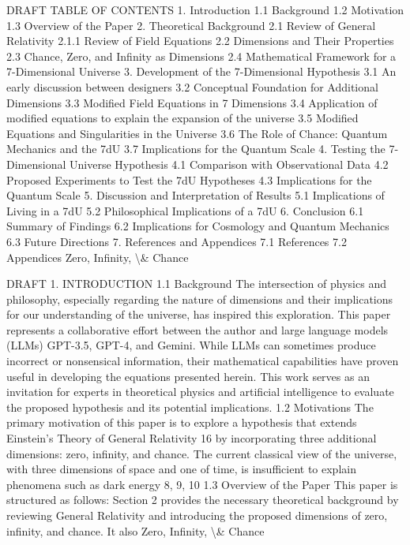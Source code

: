 \documentclass[12pt]{article}
\begin{document}
DRAFT
TABLE OF CONTENTS
1. Introduction
1.1 Background
1.2 Motivation
1.3 Overview of the Paper
2. Theoretical Background
2.1 Review of General Relativity
2.1.1 Review of Field Equations
2.2 Dimensions and Their Properties
2.3 Chance, Zero, and Inﬁnity as Dimensions
2.4 Mathematical Framework for a 7-Dimensional Universe
3. Development of the 7-Dimensional Hypothesis
3.1 An early discussion between designers
3.2 Conceptual Foundation for Additional Dimensions
3.3 Modiﬁed Field Equations in 7 Dimensions
3.4 Application of modiﬁed equations to explain the expansion of the universe
3.5 Modiﬁed Equations and Singularities in the Universe
3.6 The Role of Chance: Quantum Mechanics and the 7dU
3.7 Implications for the Quantum Scale
4. Testing the 7-Dimensional Universe Hypothesis
4.1 Comparison with Observational Data
4.2 Proposed Experiments to Test the 7dU Hypotheses
4.3 Implications for the Quantum Scale
5. Discussion and Interpretation of Results
5.1 Implications of Living in a 7dU
5.2 Philosophical Implications of a 7dU
6. Conclusion
6.1 Summary of Findings
6.2 Implications for Cosmology and Quantum Mechanics
6.3 Future Directions
7. References and Appendices
7.1 References
7.2 Appendices
Zero, Infinity, \textbackslash{}& Chance

DRAFT
1. INTRODUCTION
1.1 Background
The intersection of physics and philosophy, especially regarding the nature of
dimensions and their implications for our understanding of the universe, has inspired
this exploration.
This paper represents a collaborative eﬀort between the author and large language
models (LLMs) GPT-3.5, GPT-4, and Gemini. While LLMs can sometimes produce
incorrect or nonsensical information, their mathematical capabilities have proven useful
in developing the equations presented herein. This work serves as an invitation for
experts in theoretical physics and artiﬁcial intelligence to evaluate the proposed
hypothesis and its potential implications.
1.2 Motivations
The primary motivation of this paper is to explore a hypothesis that extends Einstein's
Theory of General Relativity 16 by incorporating three additional dimensions: zero,
inﬁnity, and chance. The current classical view of the universe, with three dimensions
of space and one of time, is insuﬃcient to explain phenomena such as dark energy 8,
9, 10
1.3 Overview of the Paper
This paper is structured as follows:
Section 2 provides the necessary theoretical background by reviewing General
Relativity and introducing the proposed dimensions of zero, inﬁnity, and chance. It also
Zero, Infinity, \textbackslash{}& Chance
\end{document}
